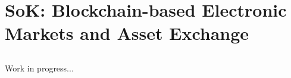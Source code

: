 \chapter{SoK: Blockchain-based Electronic Markets and Asset Exchange}
\label{chapter2}

\section{}

Work in progress...